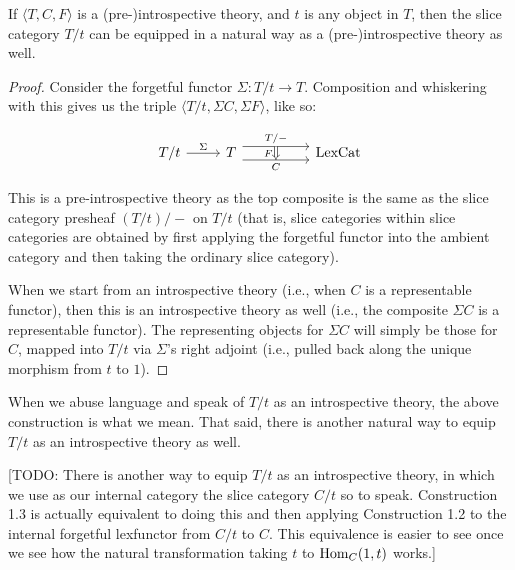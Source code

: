 \begin{construction}
If $\langle T, C, F \rangle$ is a (pre-)introspective theory, and $t$ is any object in $T$, then the slice category $T/t$ can be equipped in a natural way as a (pre-)introspective theory as well.
\end{construction}
\begin{proof}
Consider the forgetful functor $\Sigma : T/t \to T$. Composition and whiskering with this gives us the triple $\langle T/t, \Sigma C, \Sigma F \rangle$, like so:

\[\begin{tikzcd}
	{T/t} & {T} && {\LexCat}
	\arrow["{T/-}"{name=0}, from=1-2, to=1-4, shift left=2]
	\arrow["{C}"{name=1, swap}, from=1-2, to=1-4, shift right=2]
	\arrow["{\Sigma}", from=1-1, to=1-2]
	\arrow[Rightarrow, "{F}"', from=0, to=1]
\end{tikzcd}\]

This is a pre-introspective theory as the top composite is the same as the slice category presheaf $(T/t)/-$ on $T/t$ (that is, slice categories within slice categories are obtained by first applying the forgetful functor into the ambient category and then taking the ordinary slice category).

When we start from an introspective theory (i.e., when $C$ is a representable functor), then this is an introspective theory as well (i.e., the composite $\Sigma C$ is a representable functor). The representing objects for $\Sigma C$ will simply be those for $C$, mapped into $T/t$ via $\Sigma$'s right adjoint (i.e., pulled back along the unique morphism from $t$ to $1$).
\end{proof}

When we abuse language and speak of $T/t$ as an introspective theory, the above construction is what we mean. That said, there is another natural way to equip $T/t$ as an introspective theory as well.

[TODO: There is another way to equip $T/t$ as an introspective theory, in which we use as our internal category the slice category $C/t$ so to speak. Construction 1.3 is actually equivalent to doing this and then applying Construction 1.2 to the internal forgetful lexfunctor from $C/t$ to $C$. This equivalence is easier to see once we see how the natural transformation taking $t$ to $\mathrm{Hom}_C(1, t)$ works.]

